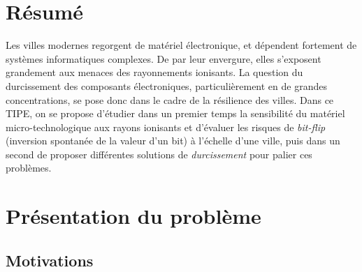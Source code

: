 \documentclass[a4paper,french,bookmarks]{article}
\makeatletter
\renewcommand\tableofcontents{%
    \@starttoc{toc}%
}
\makeatother
\begin{document}
    \section*{Résumé}

    Les villes modernes regorgent de matériel électronique, et dépendent fortement de systèmes informatiques complexes. De par leur envergure, elles s'exposent grandement aux menaces des rayonnements ionisants. La question du durcissement des composants électroniques, particulièrement en de grandes concentrations, se pose donc dans le cadre de la résilience des villes. Dans ce TIPE, on se propose d'étudier dans un premier temps la sensibilité du matériel micro-technologique aux rayons ionisants et d'évaluer les risques de \emph{bit-flip} (inversion spontanée de la valeur d'un bit) à l'échelle d'une ville, puis dans un second de proposer différentes solutions de \emph{durcissement} pour palier ces problèmes.\bigskip
    
    \begin{tcolorbox}[
        enhanced,
        frame hidden,
        sharp corners,
        detach title,
        spread outwards,
        halign              = center,
            valign              = center,
        borderline west     = {3pt}{0pt}{main3},
        coltitle            = main3, 
        interior style      = {
            left color      = main1white2!65!gray!11,
            middle color    = main1white2!50!gray!10,
            right color     = main1white2!35!gray!9
        },
        arc                 = 0 cm,
        title               = SOMMAIRE,
        boxrule             = 0pt,
        fonttitle           = \bfseries\sffamily,
        overlay             = {
            \node[rotate=90, minimum width=1cm, anchor=south,yshift=-0.8cm]
            at (frame.west) {\tcbtitle};
        },
    ]
        \begin{minipage}{0.83\linewidth}
            \sffamily
            \tableofcontents
        \end{minipage}
    \end{tcolorbox}

    \bigskip

    \section{Présentation du problème}

    \subsection{Motivations}
\end{document}
